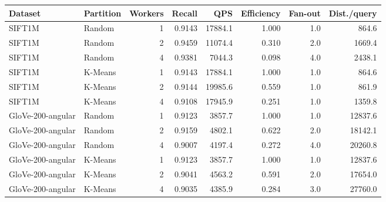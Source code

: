 \begin{tabular}{llrrrrrr}
\toprule
Dataset & Partition & Workers & Recall & QPS & Efficiency & Fan-out & Dist./query \\
\midrule
SIFT1M & Random & 1 & 0.9143 & 17884.1 & 1.000 & 1.0 & 864.6 \\
SIFT1M & Random & 2 & 0.9459 & 11074.4 & 0.310 & 2.0 & 1669.4 \\
SIFT1M & Random & 4 & 0.9381 & 7044.3 & 0.098 & 4.0 & 2438.1 \\
SIFT1M & K-Means & 1 & 0.9143 & 17884.1 & 1.000 & 1.0 & 864.6 \\
SIFT1M & K-Means & 2 & 0.9144 & 19985.6 & 0.559 & 1.0 & 861.9 \\
SIFT1M & K-Means & 4 & 0.9108 & 17945.9 & 0.251 & 1.0 & 1359.8 \\
GloVe-200-angular & Random & 1 & 0.9123 & 3857.7 & 1.000 & 1.0 & 12837.6 \\
GloVe-200-angular & Random & 2 & 0.9159 & 4802.1 & 0.622 & 2.0 & 18142.1 \\
GloVe-200-angular & Random & 4 & 0.9007 & 4197.4 & 0.272 & 4.0 & 20260.8 \\
GloVe-200-angular & K-Means & 1 & 0.9123 & 3857.7 & 1.000 & 1.0 & 12837.6 \\
GloVe-200-angular & K-Means & 2 & 0.9041 & 4563.2 & 0.591 & 2.0 & 17654.0 \\
GloVe-200-angular & K-Means & 4 & 0.9035 & 4385.9 & 0.284 & 3.0 & 27760.0 \\
\bottomrule
\end{tabular}
